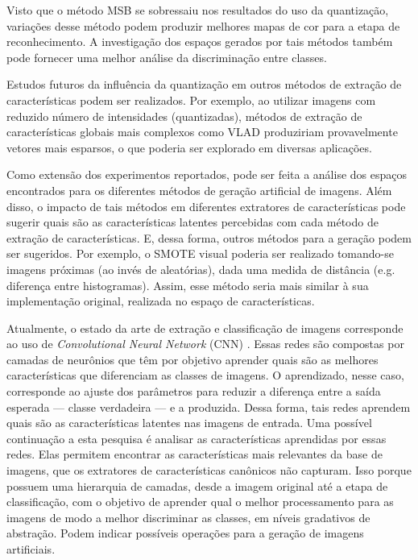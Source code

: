 Visto que o método MSB se sobressaiu nos resultados do uso da quantização, variações desse método podem produzir melhores mapas de cor para a etapa de reconhecimento. A investigação dos espaços gerados por tais métodos também pode fornecer uma melhor análise da discriminação entre classes.

Estudos futuros da influência da quantização em outros métodos de extração de características podem ser realizados. Por exemplo, ao utilizar imagens com reduzido número de intensidades (quantizadas), métodos de extração de características globais mais complexos como VLAD produziriam provavelmente vetores mais esparsos, o que poderia ser explorado em diversas aplicações.

Como extensão dos experimentos reportados, pode ser feita a análise dos espaços encontrados para os diferentes métodos de geração artificial de imagens. Além disso, o impacto de tais métodos em diferentes extratores de características pode sugerir quais são as características latentes percebidas com cada método de extração de características. E, dessa forma, outros métodos para a geração podem ser sugeridos. Por exemplo, o SMOTE visual poderia ser realizado tomando-se imagens próximas (ao invés de aleatórias), dada uma medida de distância (e.g. diferença entre histogramas). Assim, esse método seria mais similar à sua implementação original, realizada no espaço de características.

Atualmente, o estado da arte de extração e classificação de imagens corresponde ao uso de \textit{Convolutional Neural Network} (CNN) \cite{Schmidhuber2014}. Essas redes são compostas por camadas de neurônios que têm por objetivo aprender quais são as melhores características que diferenciam as classes de imagens. O aprendizado, nesse caso, corresponde ao ajuste dos parâmetros para reduzir a diferença entre a saída esperada --- classe verdadeira --- e a produzida. Dessa forma, tais redes aprendem quais são as características latentes nas imagens de entrada. Uma possível continuação a esta pesquisa é analisar as características aprendidas por essas redes. Elas permitem encontrar as características mais relevantes da base de imagens, que os extratores de características canônicos não capturam. Isso porque possuem uma hierarquia de camadas, desde a imagem original até a etapa de classificação, com o objetivo de aprender qual o melhor processamento para as imagens de modo a melhor discriminar as classes, em níveis gradativos de abstração. Podem indicar possíveis operações para a geração de imagens artificiais.

